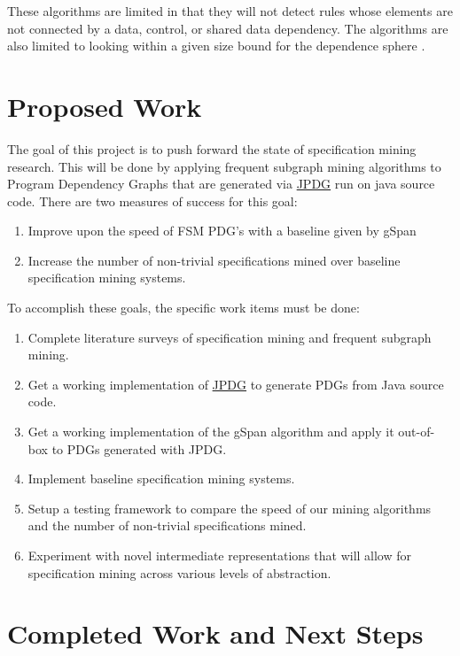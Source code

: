 \documentclass[12pt]{article}
\begin{document}
These algorithms are limited in that they will not detect rules whose elements are not connected by a data, control, or shared data dependency. The algorithms are also limited to looking within a given size bound for the dependence sphere \cite{DBLP:journals/smr/ChangP12}.

\section{Proposed Work}
The goal of this project is to push forward the state of specification mining research. This will be done by applying frequent subgraph mining algorithms to Program Dependency Graphs that are generated via \hyperref[subsection:JPDG]{JPDG} run on java source code. There are two measures of success for this goal:

\begin{enumerate}
    \item Improve upon the speed of FSM PDG's with a baseline given by gSpan
    \item Increase the number of non-trivial specifications mined over baseline specification mining systems.
\end{enumerate}

\noindent To accomplish these goals, the specific work items must be done:

\begin{enumerate}
    \item Complete literature surveys of specification mining and frequent subgraph mining.
    \item Get a working implementation of \hyperref[subsection:JPDG]{JPDG} to generate PDGs from Java source code.
    \item Get a working implementation of the gSpan algorithm and apply it out-of-box to PDGs generated with JPDG.
    \item Implement baseline specification mining systems.
    \item Setup a testing framework to compare the speed of our mining algorithms and the number of non-trivial specifications mined.
    \item Experiment with novel intermediate representations that will allow for specification mining across various levels of abstraction.
\end{enumerate}

\section{Completed Work and Next Steps}
\end{document}
